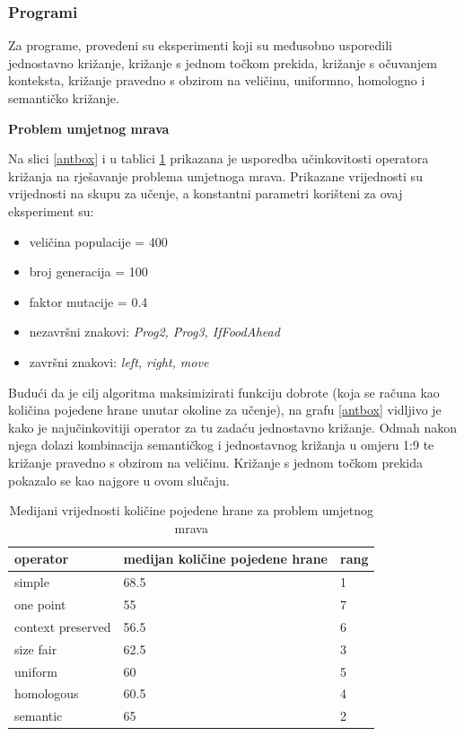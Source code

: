 \subsubsection{Programi}

Za programe, provedeni su eksperimenti koji su međusobno usporedili jednostavno križanje, križanje s jednom točkom prekida, križanje s očuvanjem konteksta, križanje pravedno s obzirom na veličinu, uniformno, homologno i semantičko križanje.

\textbf{Problem umjetnog mrava}

Na slici \ref{antbox} i u tablici \ref{anttable} prikazana je usporedba učinkovitosti operatora križanja na rješavanje problema umjetnoga mrava. Prikazane vrijednosti su vrijednosti na skupu za učenje, a konstantni parametri korišteni za ovaj eksperiment su:
\begin{itemize}
\item{veličina populacije = 400}
\item{broj generacija = 100}
\item{faktor mutacije = 0.4}
\item{nezavršni znakovi: \textit{Prog2, Prog3, IfFoodAhead}}
\item{završni znakovi: \textit{left, right, move}}
\end{itemize} 

Budući da je cilj algoritma maksimizirati funkciju dobrote (koja se računa kao količina pojedene hrane unutar okoline za učenje), na grafu \ref{antbox} vidljivo je kako je najučinkovitiji operator za tu zadaću jednostavno križanje. Odmah nakon njega dolazi kombinacija semantičkog i jednostavnog križanja u omjeru 1:9 te križanje pravedno s obzirom na veličinu. Križanje s jednom točkom prekida pokazalo se kao najgore u ovom slučaju.

\begin{table}[H]
 	\centering
    \caption{Medijani vrijednosti količine pojedene hrane za problem umjetnog mrava}
    \begin{tabular}{| l | l | l |}
    \hline
    \textbf{operator} & \textbf{medijan količine pojedene hrane} & \textbf{rang}\\ \hline
    simple & 68.5 & 1\\ \hline
    one point & 55 & 7\\ \hline
    context preserved & 56.5 & 6\\ \hline
    size fair & 62.5 & 3\\ \hline
    uniform & 60 & 5\\ \hline
    homologous & 60.5 & 4\\ \hline
    semantic & 65 & 2\\ \hline
    \end{tabular}
    

    \label{anttable}
\end{table}

